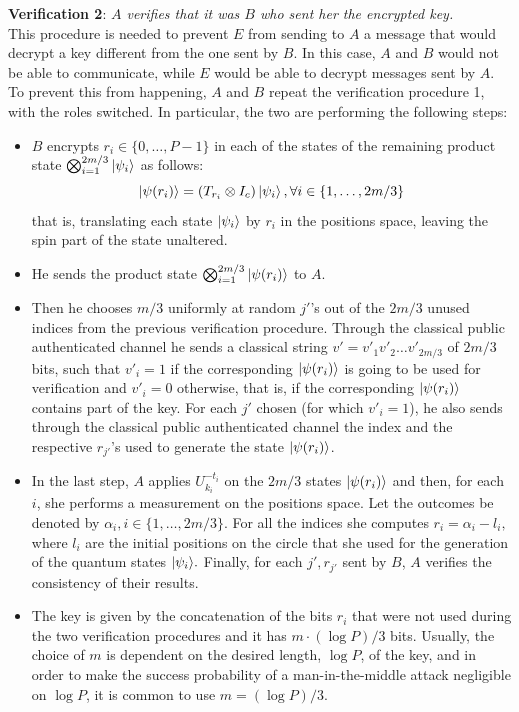 \textbf{Verification 2}: \textit{$A$ verifies that it was $B$ who sent her the encrypted key.}\\
This procedure is needed to prevent $E$ from sending to $A$ a message that would decrypt a key different from the one sent by $B$. In this case, $A$ and $B$ would not be able to communicate, while $E$ would be able to decrypt messages sent by $A$. To prevent this from happening, $A$ and $B$ repeat the verification procedure 1, with the roles switched. In particular, the two are performing the following steps:
\begin{itemize}
	\item $B$ encrypts $r_{i}\in \{0,\ldots,P-1\}$ in each of the states of the remaining product state $\bigotimes_{i=1}^{2m/3}| \psi_i \rangle$ as follows:
	 $$\Ket{\psi(r_{i})} = (T_{r_i}\otimes I_c) \Ket{\psi_{i}}, \forall i\in\{1,\ldots,2m/3\}$$
	 that is, translating each state $| \psi_i \rangle$ by $r_i$ in the positions space, leaving the spin part of the state unaltered. 
	 \item He sends the product state $\bigotimes_{i=1}^{2m/3}\Ket{\psi(r_{i})}$ to $A$.
	 \item Then he chooses $m/3 $ uniformly at random $j'$'s out of the $2m/3$ unused indices from the previous verification procedure. Through the classical public authenticated channel he sends a classical string $v'=v'_1v'_2\ldots v'_{2m/3}$ of $2m/3$ bits, such that $v'_i=1$ if the corresponding $| \psi(r_i) \rangle$ is going to be used for verification and $v'_i=0$ otherwise, that is, if the corresponding $| \psi(r_i) \rangle$ contains part of the key. For each $j'$ chosen (for which $v'_i = 1$), he also sends through the classical public authenticated channel the index and the respective $r_{j'}$'s used to generate the state $|  \psi(r_i) \rangle$. 	
	 \item In the last step, $A$ applies $U_{k_i}^{-t_i}$ on the $2m/3$ states $\Ket{\psi(r_i)}$ and then, for each $i$, she performs a measurement on the positions space. Let the outcomes be denoted by $\alpha_i, i\in \{1,\ldots,2m/3\}$. For all the indices she computes $r_i=\alpha_i-l_i,$ where $l_i$ are the initial positions on the circle that she used for the generation of the quantum states $| \psi_i \rangle.$ Finally, for each $j', r_{j'}$ sent by $B$, $A$ verifies the consistency of their results.
	 \item The key is given by the concatenation of the bits $r_i$ that were not used during the two verification procedures and it has $m\cdot (\log P)/3$ bits. Usually, the choice of $m$ is dependent on the desired length, $\log P$, of the key, and in order to make the success probability of a man-in-the-middle attack negligible on $\log P$, it is common to use $m=(\log P)/3$.
\end{itemize}

